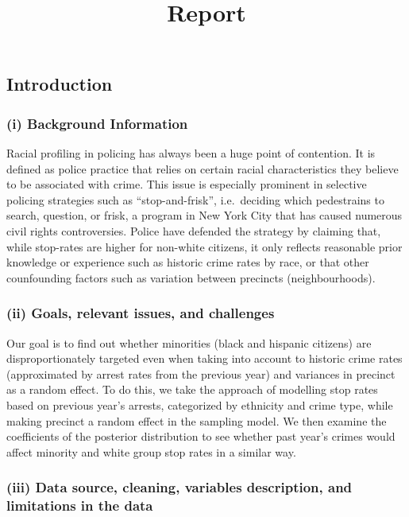 \documentclass[]{article}
\title{Report}
\author{}
\date{\vspace{-2.5em}}
\begin{document}
\maketitle

\hypertarget{introduction}{%
\subsection{Introduction}\label{introduction}}

\hypertarget{i-background-information}{%
\subsubsection{(i) Background
Information}\label{i-background-information}}

Racial profiling in policing has always been a huge point of contention.
It is defined as police practice that relies on certain racial
characteristics they believe to be associated with crime. This issue is
especially prominent in selective policing strategies such as
``stop-and-frisk'', i.e.~deciding which pedestrains to search, question,
or frisk, a program in New York City that has caused numerous civil
rights controversies. Police have defended the strategy by claiming
that, while stop-rates are higher for non-white citizens, it only
reflects reasonable prior knowledge or experience such as historic crime
rates by race, or that other counfounding factors such as variation
between precincts (neighbourhoods).

\hypertarget{ii-goals-relevant-issues-and-challenges}{%
\subsubsection{(ii) Goals, relevant issues, and
challenges}\label{ii-goals-relevant-issues-and-challenges}}

Our goal is to find out whether minorities (black and hispanic citizens)
are disproportionately targeted even when taking into account to
historic crime rates (approximated by arrest rates from the previous
year) and variances in precinct as a random effect. To do this, we take
the approach of modelling stop rates based on previous year's arrests,
categorized by ethnicity and crime type, while making precinct a random
effect in the sampling model. We then examine the coefficients of the
posterior distribution to see whether past year's crimes would affect
minority and white group stop rates in a similar way.

\hypertarget{iii-data-source-cleaning-variables-description-and-limitations-in-the-data}{%
\subsubsection{(iii) Data source, cleaning, variables description, and
limitations in the
data}\label{iii-data-source-cleaning-variables-description-and-limitations-in-the-data}}
\end{document}
